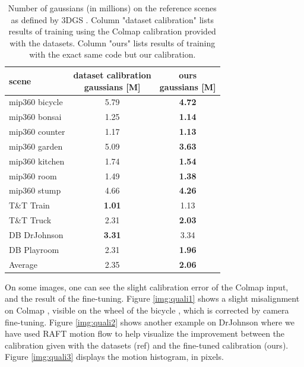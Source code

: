 \documentclass[a4paper,twoside,french]{article}
\begin{document}
  \begin{table}[h]
    \begin{center}
      {
      \begin{tabular}{|p{2.5cm}|c|c|}
        \hline
        scene & \shortstack{dataset calibration \\ gaussians [M]} & \shortstack{ours \\ gaussians [M]} \\
        \hline
        mip360 bicycle & 5.79 & \textbf{4.72} \\
        mip360 bonsai & 1.25 & \textbf{1.14} \\
        mip360 counter & 1.17 & \textbf{1.13} \\
        mip360 garden & 5.09 & \textbf{3.63} \\
        mip360 kitchen & 1.74 & \textbf{1.54} \\
        mip360 room & 1.49 & \textbf{1.38} \\
        mip360 stump & 4.66 & \textbf{4.26} \\
        T\&T Train & \textbf{1.01} & 1.13 \\
        T\&T Truck & 2.31 & \textbf{2.03} \\
        DB DrJohnson & \textbf{3.31} & 3.34 \\
        DB Playroom & 2.31 & \textbf{1.96} \\
        \hline
        Average & 2.35 & \textbf{2.06} \\
        \hline
        \end{tabular}
        }
        \caption{Number of gaussians (in millions) on the reference scenes as defined by 3DGS \cite{kerbl20233d}.
        Column "dataset calibration" lists results of training using the Colmap calibration provided with the datasets.
        Column "ours" lists results of training with the exact same code but our calibration.}
        \label{table:n_vertices}
      \end{center}
    \end{table}
    
  On some images, one can see the slight calibration error of the Colmap input, and the result of the fine-tuning.
	Figure \ref{img:quali1} shows a slight misalignment on Colmap \cite{schonberger2018robust}, visible on the wheel
	of the bicycle \cite{barron2022mip}, which is corrected by camera fine-tuning.
  Figure \ref{img:quali2} shows another example on DrJohnson \cite{HPPFDB18} where we have used RAFT \cite{DBLP:journals/corr/abs-2003-12039}
  motion flow to help visualize the improvement between the calibration given with the datasets (ref) and the fine-tuned
  calibration (ours). Figure \ref{img:quali3} displays the motion histogram, in pixels.
	
\end{document}
